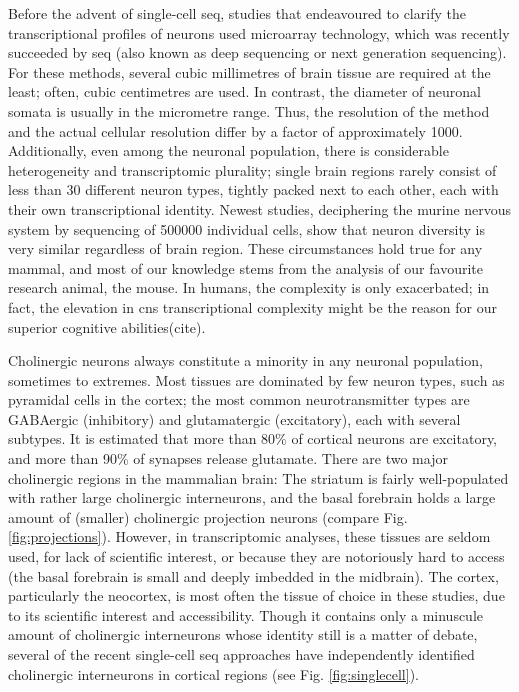 Before the advent of single-cell \ac{seq}, studies that endeavoured to clarify the transcriptional profiles of neurons used microarray technology, which was recently succeeded by \ac{seq} (also known as deep sequencing or next generation sequencing). For these methods, several cubic millimetres of brain tissue are required at the least; often, cubic centimetres are used. In contrast, the diameter of neuronal somata is usually in the micrometre range. Thus, the resolution of the method and the actual cellular resolution differ by a factor of approximately \num{1000}. Additionally, even among the neuronal population, there is considerable heterogeneity and transcriptomic plurality; single brain regions rarely consist of less than 30 different neuron types, tightly packed next to each other, each with their own transcriptional identity\cite{Darmanis2015, Zeisel2015, Tasic2016, Habib2016}. Newest studies, deciphering the murine nervous system by sequencing of \num{500000} individual cells, show that neuron diversity is very similar regardless of brain region\cite{Zeisel2018}. These circumstances hold true for any mammal, and most of our knowledge stems from the analysis of our favourite research animal, the mouse. In humans, the complexity is only exacerbated; in fact, the elevation in \ac{cns} transcriptional complexity might be the reason for our superior cognitive abilities(cite).

Cholinergic neurons always constitute a minority in any neuronal population, sometimes to extremes. Most tissues are dominated by few neuron types, such as pyramidal cells in the cortex; the most common neurotransmitter types are GABAergic (inhibitory) and glutamatergic (excitatory), each with several subtypes. It is estimated that more than 80\% of cortical neurons are excitatory, and more than 90\% of synapses release glutamate\cite{Raichle2002}. There are two major cholinergic regions in the mammalian brain: The striatum is fairly well-populated with rather large cholinergic interneurons, and the basal forebrain holds a large amount of (smaller) cholinergic projection neurons (compare Fig. \ref{fig:projections}). However, in transcriptomic analyses, these tissues are seldom used, for lack of scientific interest, or because they are notoriously hard to access (the basal forebrain is small and deeply imbedded in the midbrain). The cortex, particularly the neocortex, is most often the tissue of choice in these studies, due to its scientific interest and accessibility. Though it contains only a minuscule amount of cholinergic interneurons whose identity still is a matter of debate, several of the recent single-cell \ac{seq} approaches have independently identified cholinergic interneurons in cortical regions (see Fig. \ref{fig:singlecell}). 

